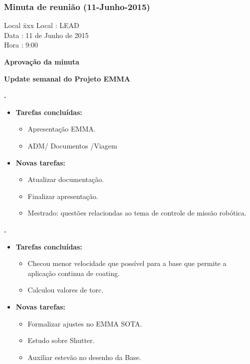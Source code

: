 \subsubsection{Minuta de reunião (11-Junho-2015)}

\begin{tabbing}
  Local \= xxx \kill
  Local \> : LEAD \\
  Data  \> : 11 de Junho de 2015 \\
  Hora  \> : 9:00
\end{tabbing}


\textbf{Aprovação da minuta}

\textbf{Update semanal do Projeto EMMA}
   
\textbf{\julia.} 
	\begin{itemize}
		\item \textbf{Tarefas concluídas:}
			\begin{itemize}    
				\item Apresentação EMMA.
				\item ADM/ Documentos /Viagem
			\end{itemize}
		
		\item \textbf{Novas tarefas:}
			\begin{itemize} 
				\item Atualizar documentação.
				\item Finalizar apresentação.
				\item Mestrado: questões relaciondas ao tema de controle de missão
				robótica.
			\end{itemize}
	\end{itemize}
					
		
\textbf{\elael.} 
	\begin{itemize}
		\item \textbf{Tarefas concluídas:}
			\begin{itemize}    
				\item Checou menor velocidade que possível para a base que permite a
				aplicação continua de coating.
				\item Calculou valores de torc.
			\end{itemize}
		
		\item \textbf{Novas tarefas:}
			\begin{itemize} 
				\item Formalizar ajustes no EMMA SOTA.
				\item Estudo sobre Shutter.
				\item Auxiliar estevão no desenho da Base.
			\end{itemize}
	\end{itemize}
					
